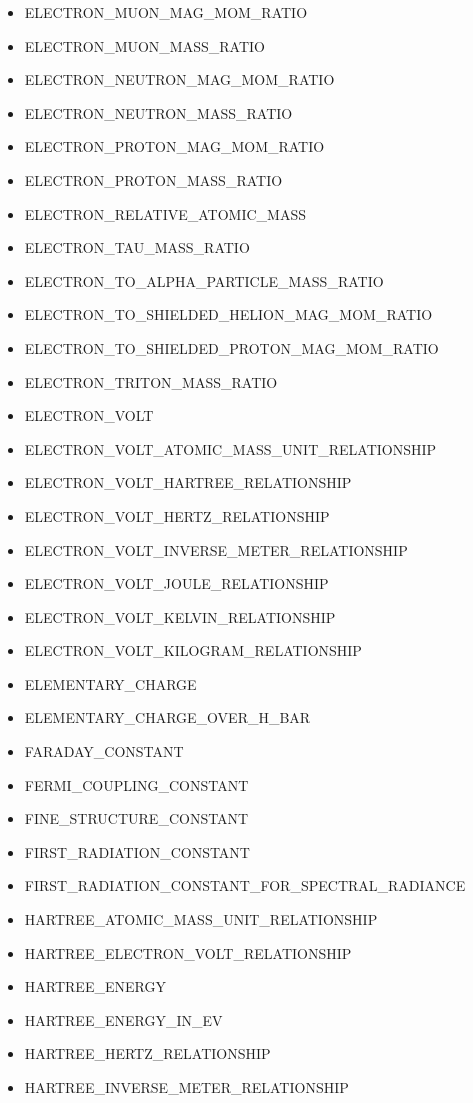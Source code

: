 \begin{itemize}
\item ELECTRON\_MUON\_MAG\_MOM\_RATIO
\item ELECTRON\_MUON\_MASS\_RATIO
\item ELECTRON\_NEUTRON\_MAG\_MOM\_RATIO
\item ELECTRON\_NEUTRON\_MASS\_RATIO
\item ELECTRON\_PROTON\_MAG\_MOM\_RATIO
\item ELECTRON\_PROTON\_MASS\_RATIO
\item ELECTRON\_RELATIVE\_ATOMIC\_MASS
\item ELECTRON\_TAU\_MASS\_RATIO
\item ELECTRON\_TO\_ALPHA\_PARTICLE\_MASS\_RATIO
\item ELECTRON\_TO\_SHIELDED\_HELION\_MAG\_MOM\_RATIO
\item ELECTRON\_TO\_SHIELDED\_PROTON\_MAG\_MOM\_RATIO
\item ELECTRON\_TRITON\_MASS\_RATIO
\item ELECTRON\_VOLT
\item ELECTRON\_VOLT\_ATOMIC\_MASS\_UNIT\_RELATIONSHIP
\item ELECTRON\_VOLT\_HARTREE\_RELATIONSHIP
\item ELECTRON\_VOLT\_HERTZ\_RELATIONSHIP
\item ELECTRON\_VOLT\_INVERSE\_METER\_RELATIONSHIP
\item ELECTRON\_VOLT\_JOULE\_RELATIONSHIP
\item ELECTRON\_VOLT\_KELVIN\_RELATIONSHIP
\item ELECTRON\_VOLT\_KILOGRAM\_RELATIONSHIP
\item ELEMENTARY\_CHARGE
\item ELEMENTARY\_CHARGE\_OVER\_H\_BAR
\item FARADAY\_CONSTANT
\item FERMI\_COUPLING\_CONSTANT
\item FINE\_STRUCTURE\_CONSTANT
\item FIRST\_RADIATION\_CONSTANT
\item FIRST\_RADIATION\_CONSTANT\_FOR\_SPECTRAL\_RADIANCE
\item HARTREE\_ATOMIC\_MASS\_UNIT\_RELATIONSHIP
\item HARTREE\_ELECTRON\_VOLT\_RELATIONSHIP
\item HARTREE\_ENERGY
\item HARTREE\_ENERGY\_IN\_EV
\item HARTREE\_HERTZ\_RELATIONSHIP
\item HARTREE\_INVERSE\_METER\_RELATIONSHIP

\end{itemize}
